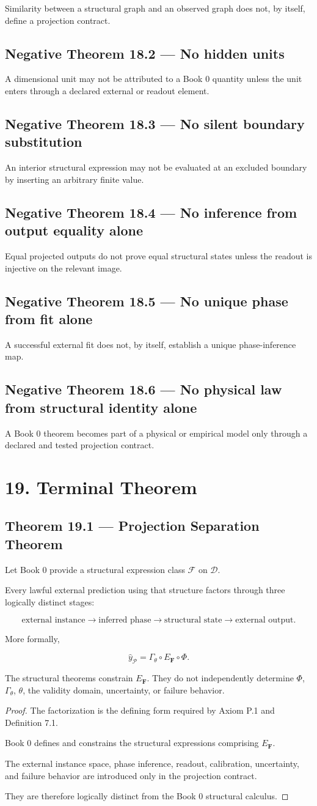 \documentclass[11pt,oneside,openany]{book}
\newcommand{\PCsection}[1]{%
  \section*{#1}\addcontentsline{toc}{section}{#1}%
}
\newcommand{\PCsubsection}[1]{%
  \subsection*{#1}%
}
\begin{document}
Similarity between a structural graph and an observed graph does not, by itself, define a projection contract.

\PCsubsection{Negative Theorem 18.2 --- No hidden units}

A dimensional unit may not be attributed to a Book 0 quantity unless the unit enters through a declared external or readout element.

\PCsubsection{Negative Theorem 18.3 --- No silent boundary substitution}

An interior structural expression may not be evaluated at an excluded boundary by inserting an arbitrary finite value.

\PCsubsection{Negative Theorem 18.4 --- No inference from output equality alone}

Equal projected outputs do not prove equal structural states unless the readout is injective on the relevant image.

\PCsubsection{Negative Theorem 18.5 --- No unique phase from fit alone}

A successful external fit does not, by itself, establish a unique phase-inference map.

\PCsubsection{Negative Theorem 18.6 --- No physical law from structural identity alone}

A Book 0 theorem becomes part of a physical or empirical model only through a declared and tested projection contract.


\PCsection{19. Terminal Theorem}

\PCsubsection{Theorem 19.1 --- Projection Separation Theorem}

Let Book 0 provide a structural expression class \(\mathscr F\) on \(\mathcal D\).

Every lawful external prediction using that structure factors through three logically distinct stages:

\[
\boxed{ \text{external instance} \longrightarrow \text{inferred phase} \longrightarrow \text{structural state} \longrightarrow \text{external output}. }
\]

More formally,

\[
\boxed{ \widehat y_{\mathcal P} = \Gamma_\theta \circ E_{\mathbf F} \circ \Phi. }
\]

The structural theorems constrain \(E_{\mathbf F}\). They do not independently determine \(\Phi\), \(\Gamma_\theta\), \(\theta\), the validity domain, uncertainty, or failure behavior.

\begin{proof}
The factorization is the defining form required by Axiom P.1 and Definition 7.1.

Book 0 defines and constrains the structural expressions comprising \(E_{\mathbf F}\).

The external instance space, phase inference, readout, calibration, uncertainty, and failure behavior are introduced only in the projection contract.

They are therefore logically distinct from the Book 0 structural calculus.


\end{proof}
\end{document}
